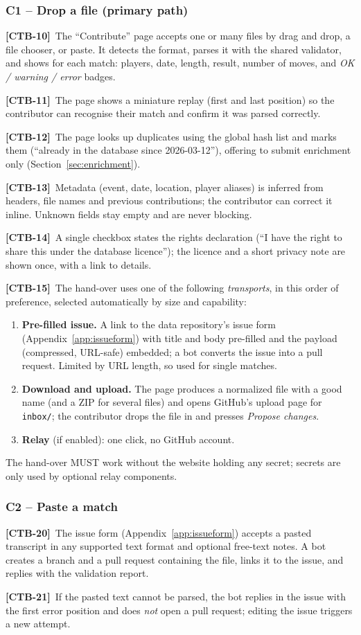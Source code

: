 \documentclass[11pt,a4paper]{article}
\newcommand{\req}[2]{\par\smallskip\noindent\hypertarget{#1}{}\textbf{[#1]}\ #2\par}
\begin{document}
\subsubsection*{C1 -- Drop a file (primary path)}
\req{CTB-10}{The ``Contribute'' page accepts one or many files by drag and drop, a file chooser, or paste. It detects the format, parses it with the shared validator, and shows for each match: players, date, length, result, number of moves, and \emph{OK / warning / error} badges.}
\req{CTB-11}{The page shows a miniature replay (first and last position) so the contributor can recognise their match and confirm it was parsed correctly.}
\req{CTB-12}{The page looks up duplicates using the global hash list and marks them (``already in the database since 2026-03-12''), offering to submit enrichment only (Section~\ref{sec:enrichment}).}
\req{CTB-13}{Metadata (event, date, location, player aliases) is inferred from headers, file names and previous contributions; the contributor can correct it inline. Unknown fields stay empty and are never blocking.}
\req{CTB-14}{A single checkbox states the rights declaration (``I have the right to share this under the database licence''); the licence and a short privacy note are shown once, with a link to details.}
\req{CTB-15}{The hand-over uses one of the following \emph{transports}, in this order of preference, selected automatically by size and capability:}
\begin{enumerate}[label=T\arabic*., leftmargin=1.5cm]
  \item \textbf{Pre-filled issue.} A link to the data repository's issue form (Appendix~\ref{app:issueform}) with title and body pre-filled and the payload (compressed, URL-safe) embedded; a bot converts the issue into a pull request. Limited by URL length, so used for single matches.
  \item \textbf{Download and upload.} The page produces a normalized file with a good name (and a ZIP for several files) and opens GitHub's upload page for \texttt{inbox/}; the contributor drops the file in and presses \emph{Propose changes}.
  \item \textbf{Relay} (if enabled): one click, no GitHub account.
\end{enumerate}
The hand-over MUST work without the website holding any secret; secrets are only used by optional relay components.

\subsubsection*{C2 -- Paste a match}
\req{CTB-20}{The issue form (Appendix~\ref{app:issueform}) accepts a pasted transcript in any supported text format and optional free-text notes. A bot creates a branch and a pull request containing the file, links it to the issue, and replies with the validation report.}
\req{CTB-21}{If the pasted text cannot be parsed, the bot replies in the issue with the first error position and does \emph{not} open a pull request; editing the issue triggers a new attempt.}
\end{document}
